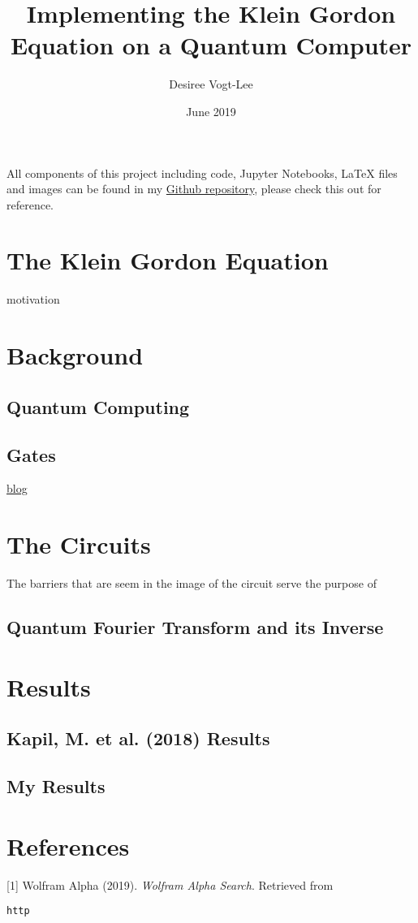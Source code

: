 \documentclass{article}
\title{Implementing the Klein Gordon Equation on a Quantum Computer}
\author{Desiree Vogt-Lee}
\date{June 2019}
\begin{document}
	\maketitle
	\begin{center}
	    All components of this project including code, Jupyter Notebooks, LaTeX files and images can be found in my \href{https://github.com/desireevl/PHYS3051}{Github repository}, please check this out for reference.
	\end{center}


\section{The Klein Gordon Equation}

motivation 

\section{Background}
\subsection{Quantum Computing}
\subsection{Gates}

\href{https://desireevl.github.io/archive/2019/04/03/quantum-intro.html}{blog}


\section{The Circuits}
The barriers that are seem in the image of the circuit serve the purpose of
\subsection{Quantum Fourier Transform and its Inverse}


\section{Results}
\subsection{Kapil, M. et al. (2018) Results}

\subsection{My Results}

\section{References}
[1] Wolfram Alpha (2019). \textit{Wolfram Alpha Search}. Retrieved from
\begin{verbatim}
http
\end{verbatim}
\end{document}
